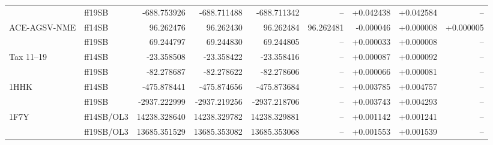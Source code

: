 \begin{tabular}{@{}llrrrrrrr@{}}
 & ff19SB & -688.753926 & -688.711488 & -688.711342 & -- & +0.042438 & +0.042584 & -- \\
ACE-AGSV-NME & ff14SB & 96.262476 & 96.262430 & 96.262484 & 96.262481 & -0.000046 & +0.000008 & +0.000005 \\
 & ff19SB & 69.244797 & 69.244830 & 69.244805 & -- & +0.000033 & +0.000008 & -- \\
Tax 11--19 & ff14SB & -23.358508 & -23.358422 & -23.358416 & -- & +0.000087 & +0.000092 & -- \\
 & ff19SB & -82.278687 & -82.278622 & -82.278606 & -- & +0.000066 & +0.000081 & -- \\
1HHK & ff14SB & -475.878441 & -475.874656 & -475.873684 & -- & +0.003785 & +0.004757 & -- \\
 & ff19SB & -2937.222999 & -2937.219256 & -2937.218706 & -- & +0.003743 & +0.004293 & -- \\
1F7Y & ff14SB/OL3 & 14238.328640 & 14238.329782 & 14238.329881 & -- & +0.001142 & +0.001241 & -- \\
 & ff19SB/OL3 & 13685.351529 & 13685.353082 & 13685.353068 & -- & +0.001553 & +0.001539 & -- \\
\bottomrule
\end{tabular}
